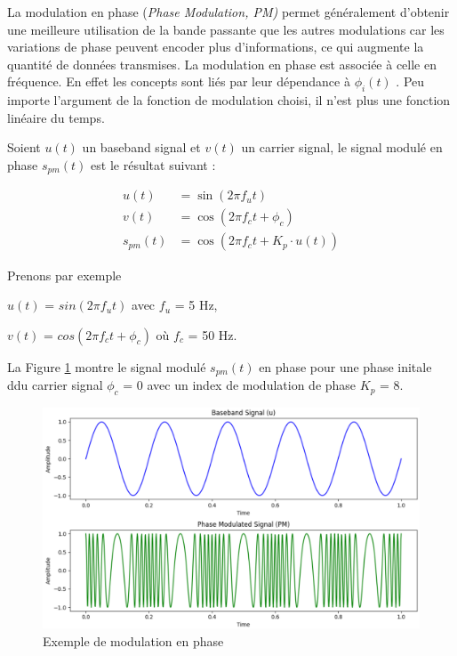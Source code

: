 La modulation en phase (\textit{Phase Modulation, PM)} permet généralement d'obtenir une meilleure utilisation de la bande passante que les autres modulations car les variations de phase peuvent encoder plus d'informations, ce qui augmente la quantité de données transmises. La modulation en phase est associée à celle en fréquence. En effet les concepts sont liés par leur dépendance à $\phi_i(t)$ . Peu importe l'argument de la fonction de modulation choisi, il n'est plus une fonction linéaire du temps.

Soient $u(t)$ un baseband signal et $v(t)$ un carrier signal, le signal modulé en phase $s_{pm}(t)$ est le résultat suivant :

\begin{align}
    u(t) &= \sin(2\pi f_{u}t) \\
    v(t) &= \cos(2\pi f_{c}t + \phi_{c}) \\
    s_{pm}(t) &= \cos\left(2\pi f_{c}t + K_{p} \cdot u(t)\right)
\end{align}

\vspace{0.1cm}

Prenons par exemple

\vspace{0.1cm}

$u(t)$ = $sin(2\pi f_{u}t)$ avec $f_{u}$ = 5 Hz,

$v(t)$ = $cos(2\pi f_{c}t + \phi_{c})$ où $f_{c}$ = 50 Hz.

\vspace{0.1cm}

La Figure \ref{term3} montre le signal modulé $s_{pm}(t)$ en phase pour une phase initale ddu carrier signal $\phi_{c}$ = 0 avec un index de modulation de phase $K_{p}$ = 8.


\begin{figure}[h]
\centering

\includegraphics[scale=0.5]{images/PM_mod.PNG}
\caption{Exemple de modulation en phase}\label{term3}
\end{figure}


